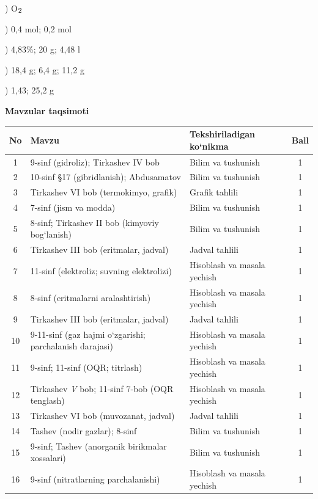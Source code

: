 \documentclass[11pt,a4paper]{article}
\renewcommand{\textsubscript}[1]{\ensuremath{_{\text{\fontsize{8}{8}\selectfont #1}}}}
\begin{document}
) O\textsubscript{2}\par
{}) 0,4 mol; 0,2 mol\par
{}) 4,83\%; 20 g; 4,48 l\par
{}) 18,4 g; 6,4 g; 11,2 g\par
{}) 1,43; 25,2 g\par
\par\bigskip\noindent\textbf{Mavzular taqsimoti}\par\smallskip
{\small\noindent\begin{longtable}{|c|p{7.2cm}|p{5.4cm}|c|}\hline \textbf{No} & \textbf{Mavzu} & \textbf{Tekshiriladigan ko`nikma} & \textbf{Ball}\\\hline
1 & 9-sinf (gidroliz); Tirkashev IV bob & Bilim va tushunish & 1\\\hline
2 & 10-sinf \S{}17 (gibridlanish); Abdusamatov & Bilim va tushunish & 1\\\hline
3 & Tirkashev VI bob (termokimyo, grafik) & Grafik tahlili & 1\\\hline
4 & 7-sinf (jism va modda) & Bilim va tushunish & 1\\\hline
5 & 8-sinf; Tirkashev II bob (kimyoviy bog`lanish) & Bilim va tushunish & 1\\\hline
6 & Tirkashev III bob (eritmalar, jadval) & Jadval tahlili & 1\\\hline
7 & 11-sinf (elektroliz; suvning elektrolizi) & Hisoblash va masala yechish & 1\\\hline
8 & 8-sinf (eritmalarni aralashtirish) & Hisoblash va masala yechish & 1\\\hline
9 & Tirkashev III bob (eritmalar, jadval) & Jadval tahlili & 1\\\hline
10 & 9-11-sinf (gaz hajmi o`zgarishi; parchalanish darajasi) & Hisoblash va masala yechish & 1\\\hline
11 & 9-sinf; 11-sinf (OQR; titrlash) & Hisoblash va masala yechish & 1\\\hline
12 & Tirkashev \textit{V} bob; 11-sinf 7-bob (OQR tenglash) & Hisoblash va masala yechish & 1\\\hline
13 & Tirkashev VI bob (muvozanat, jadval) & Jadval tahlili & 1\\\hline
14 & Tashev (nodir gazlar); 8-sinf & Bilim va tushunish & 1\\\hline
15 & 9-sinf; Tashev (anorganik birikmalar xossalari) & Bilim va tushunish & 1\\\hline
16 & 9-sinf (nitratlarning parchalanishi) & Hisoblash va masala yechish & 1\\\hline

\end{longtable}}
\end{document}
